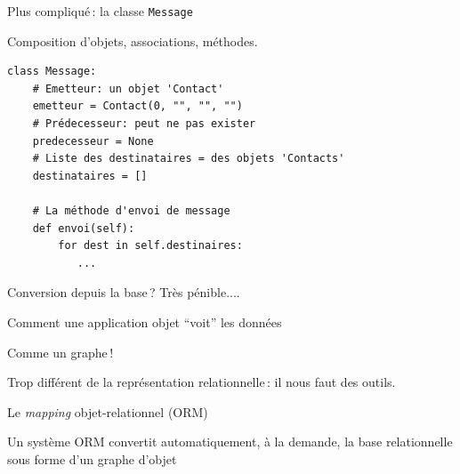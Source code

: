 \begin{frame}[fragile]{Plus compliqué\,: la classe  \texttt{Message}}

Composition d'objets,  associations, méthodes.

\vfill

\vfill

\begin{verbatim}
class Message:
    # Emetteur: un objet 'Contact'
    emetteur = Contact(0, "", "", "")
    # Prédecesseur: peut ne pas exister
    predecesseur = None
    # Liste des destinataires = des objets 'Contacts'
    destinataires = []

    # La méthode d'envoi de message
    def envoi(self):
        for dest in self.destinaires:
           ...
\end{verbatim}

\vfill

Conversion depuis la base\,? Très pénible....
\end{frame}

\begin{frame}{Comment une application objet ``voit'' les données}

Comme un graphe\,!

\vfill

\vfill


\vfill

\begin{blocgauche}
Trop différent de la représentation relationnelle\,: il nous faut des outils.

\end{blocgauche}
\end{frame}


\begin{frame}{Le \textit{mapping} objet-relationnel (ORM)}

Un système ORM convertit \alert{automatiquement}, 
\alert{à la demande}, la base relationnelle sous forme d’un graphe d’objet

\vfill


\end{frame}

